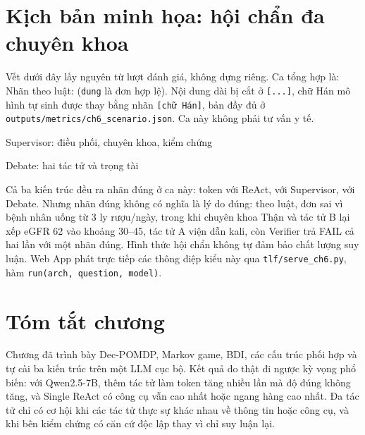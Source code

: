 \section{Kịch bản minh họa: hội chẩn đa chuyên khoa}
Vết dưới đây lấy nguyên từ lượt đánh giá, không dựng riêng. Ca tổng hợp là: \emph{} Nhãn theo luật: \textbf{} (\texttt{dung} là đơn hợp lệ). Nội dung dài bị cắt ở \texttt{[...]}, chữ Hán mô hình tự sinh được thay bằng nhãn \texttt{[chữ Hán]}, bản đầy đủ ở \texttt{outputs/metrics/ch6\_scenario.json}. Ca này không phải tư vấn y tế.

\begin{vetsuyluan}{Supervisor: điều phối, chuyên khoa, kiểm chứng}

\end{vetsuyluan}
\begin{vetsuyluan}{Debate: hai tác tử và trọng tài}

\end{vetsuyluan}

Cả ba kiến trúc đều ra nhãn đúng ở ca này:  token với ReAct,  với Supervisor,  với Debate. Nhưng nhãn đúng không có nghĩa là lý do đúng: theo luật, đơn sai vì bệnh nhân uống từ 3 ly rượu/ngày, trong khi chuyên khoa Thận và tác tử B lại xếp eGFR 62 vào khoảng 30--45, tác tử A viện dẫn kali, còn Verifier trả FAIL cả hai lần với một nhãn đúng. Hình thức hội chẩn không tự đảm bảo chất lượng suy luận. Web App phát trực tiếp các thông điệp kiểu này qua \texttt{tlf/serve\_ch6.py}, hàm \texttt{run(arch, question, model)}.

\section{Tóm tắt chương}
Chương đã trình bày Dec-POMDP, Markov game, BDI, các cấu trúc phối hợp và tự cài ba kiến trúc trên một LLM cục bộ. Kết quả đo thật đi ngược kỳ vọng phổ biến: với Qwen2.5-7B, thêm tác tử làm token tăng nhiều lần mà độ đúng không tăng, và Single ReAct có công cụ vẫn cao nhất hoặc ngang hàng cao nhất. Đa tác tử chỉ có cơ hội khi các tác tử thực sự khác nhau về thông tin hoặc công cụ, và khi bên kiểm chứng có căn cứ độc lập thay vì chỉ suy luận lại.

